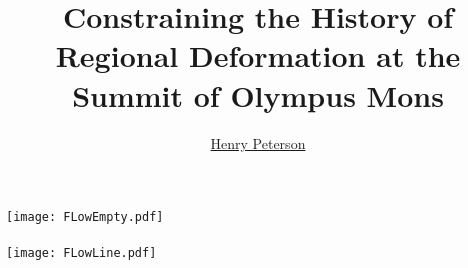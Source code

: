 \documentclass[]{article}
\author{\href{mailto:hgpa2018@mymail.pomona.edu}{Henry Peterson}}
\title{Constraining the History of Regional Deformation at the Summit of Olympus Mons}
\begin{document}
\texttt{[image: FLowEmpty.pdf]}\\~\\
\texttt{[image: FLowLine.pdf]} 
\end{document}
